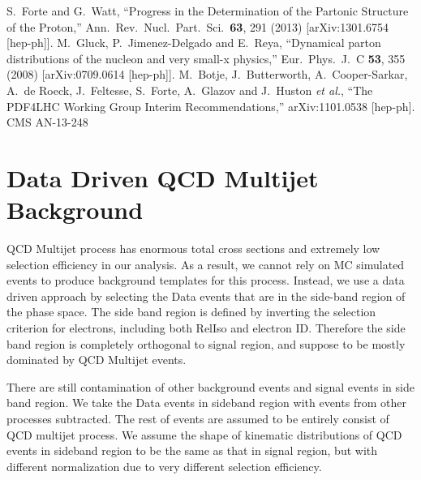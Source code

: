 \documentclass{cmspaperpdf}
\begin{document}
\begin{thebibliography}{9}
  S.~Forte and G.~Watt,
  ``Progress in the Determination of the Partonic Structure of the Proton,''
  Ann.\ Rev.\ Nucl.\ Part.\ Sci.\  {\bf 63}, 291 (2013)
  [arXiv:1301.6754 [hep-ph]].
  M.~Gluck, P.~Jimenez-Delgado and E.~Reya,
  ``Dynamical parton distributions of the nucleon and very small-x physics,''
  Eur.\ Phys.\ J.\ C {\bf 53}, 355 (2008)
  [arXiv:0709.0614 [hep-ph]].
  M.~Botje, J.~Butterworth, A.~Cooper-Sarkar, A.~de Roeck, J.~Feltesse, S.~Forte, A.~Glazov and J.~Huston {\it et al.},
  ``The PDF4LHC Working Group Interim Recommendations,''
  arXiv:1101.0538 [hep-ph].
  CMS AN-13-248


  \end{thebibliography}

\appendix
\appendixpage
\addappheadtotoc

\section{Data Driven QCD Multijet Background}

QCD Multijet process has enormous total cross sections and extremely low selection efficiency in our analysis. As a result, we cannot rely on MC simulated events to produce background templates for this process. Instead, we use a data driven approach by selecting the Data events that are in the side-band region of the phase space. The side band region is defined by inverting the selection criterion for electrons, including both RelIso and electron ID. Therefore the side band region is completely orthogonal to signal region, and suppose to be mostly dominated by QCD Multijet events. 

There are still contamination of other background events and signal events in side band region. We take the Data events in sideband region with events from other processes subtracted. The rest of events are assumed to be entirely consist of QCD multijet process. We assume the shape of kinematic distributions of QCD events in sideband region to be the same as that in signal region, but with different normalization due to very different selection efficiency. 
\end{document}
